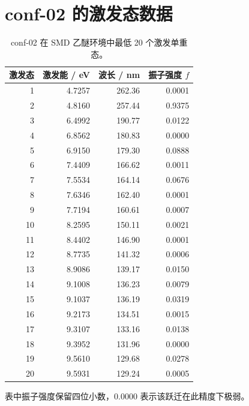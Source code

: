 \documentclass[a4paper,12pt]{article}
\begin{document}
\clearpage
\appendix
\section{conf-02 的激发态数据}
\begin{table}[H]
\centering\small
\caption{conf-02 在 SMD 乙醚环境中最低 20 个激发单重态。}
\begin{tabular}{rrrr}
\toprule
激发态 & 激发能 / eV & 波长 / nm & 振子强度 $f$\\
\midrule
1 & 4.7257 & 262.36 & 0.0001\\
2 & 4.8160 & 257.44 & 0.9375\\
3 & 6.4992 & 190.77 & 0.0122\\
4 & 6.8562 & 180.83 & 0.0000\\
5 & 6.9150 & 179.30 & 0.0888\\
6 & 7.4409 & 166.62 & 0.0011\\
7 & 7.5534 & 164.14 & 0.0676\\
8 & 7.6346 & 162.40 & 0.0001\\
9 & 7.7194 & 160.61 & 0.0007\\
10 & 8.2595 & 150.11 & 0.0021\\
11 & 8.4402 & 146.90 & 0.0001\\
12 & 8.7735 & 141.32 & 0.0006\\
13 & 8.9086 & 139.17 & 0.0150\\
14 & 9.1008 & 136.23 & 0.0079\\
15 & 9.1037 & 136.19 & 0.0319\\
16 & 9.2173 & 134.51 & 0.0015\\
17 & 9.3107 & 133.16 & 0.0138\\
18 & 9.3952 & 131.96 & 0.0000\\
19 & 9.5610 & 129.68 & 0.0278\\
20 & 9.5931 & 129.24 & 0.0005\\
\bottomrule
\end{tabular}
\end{table}
表中振子强度保留四位小数，$0.0000$ 表示该跃迁在此精度下极弱。
\end{document}
